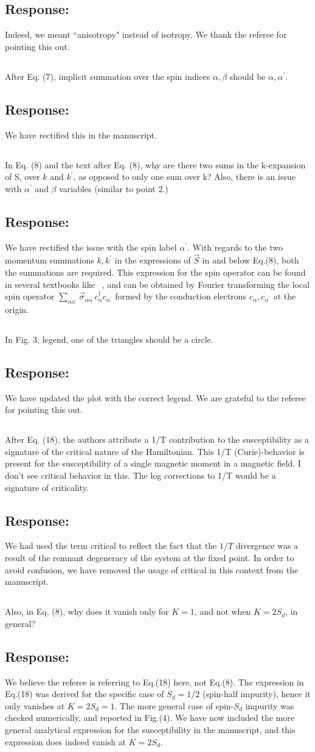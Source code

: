 \documentclass[11pt]{article}
\newcommand{\response}[1]{{\color{blue}\subsection*{Response:}{#1}}}
\newcommand{\point}[1]{\subsection{}{#1}}
\begin{document}
\response{ Indeed, we meant ``anisotropy" instead of isotropy. We thank the referee for pointing this out.}

\point{ 
After Eq. (7), implicit summation over the spin indices $\alpha,\beta$ should be $\alpha,\alpha^\prime$.}

\response{ We have rectified this in the manuscript.}

\point{ 
In Eq. (8) and the text after Eq. (8), why are there two sums in the
k-expansion of S, over $k$ and $k^\prime$, as opposed to only one sum over k? Also, there is an issue with $\alpha^\prime$ and $\beta$ variables (similar to point 2.)}

\response{We have rectified the issue with the spin label \(\alpha^\prime\). With regards to the two momentum summations \(k,k^\prime\) in the expressions of \(\vec S\) in and below Eq.(8), both the summations are required. This expression for the spin operator can be found in several textbooks like ~\cite{coleman2015,hewson1993}, and can be obtained by Fourier transforming the local spin operator \(\sum_{\alpha\alpha^\prime}\vec \sigma_{\alpha\alpha^\prime}c^\dagger_{\alpha}c_{\alpha^\prime}\) formed by the conduction electrons \(c_{\alpha},c_{\alpha^\prime}\) at the origin.}

\point{
In Fig. 3, legend, one of the triangles should be a circle.}

\response{ We have updated the plot with the correct legend. We are grateful to the referee for pointing this out.}

\point{
After Eq. (18), the authors attribute a 1/T contribution to the
susceptibility as a signature of the critical nature of the Hamiltonian. This 1/T (Curie)-behavior is present for the susceptibility of a single magnetic moment in a magnetic field. I don't see critical behavior in this. The log corrections to 1/T would be a signature of criticality.}

\response{We had used the term critical to reflect the fact that the \(1/T\) divergence was a result of the remnant degeneracy of the system at the fixed point. In order to avoid confusion, we have removed the usage of critical in this context from the manuscript.}

\point{
Also, in Eq. (8), why does it vanish only for $K=1$, and not when $K=2S_{d}$, in general?}

\response{We believe the referee is referring to Eq.(18) here, not Eq.(8). The expression in Eq.(18) was derived for the specific case of $S_d = 1/2$ (spin-half impurity), hence it only vanishes at $K=2S_d=1$. The more general case of spin-\(S_d\) impurity was checked numerically, and reported in Fig.(4). We have now included the more general analytical expression for the susceptibility in the manuscript, and this expression does indeed vanish at $K = 2S_d$.}
\end{document}
